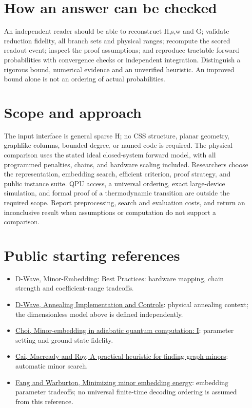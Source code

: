 \documentclass[11pt,letterpaper]{article}
\begin{document}
\section{How an answer can be checked}
An independent reader should be able to reconstruct H,s,w and G; validate reduction fidelity, all branch sets and physical ranges; recompute the scored readout event; inspect the proof assumptions; and reproduce tractable forward probabilities with convergence checks or independent integration. Distinguish a rigorous bound, numerical evidence and an unverified heuristic. An improved bound alone is not an ordering of actual probabilities.\par
\section{Scope and approach}
The input interface is general sparse H; no CSS structure, planar geometry, graphlike columns, bounded degree, or named code is required. The physical comparison uses the stated ideal closed-system forward model, with all programmed penalties, chains, and hardware scaling included. Researchers choose the representation, embedding search, efficient criterion, proof strategy, and public instance suite. QPU access, a universal ordering, exact large-device simulation, and formal proof of a thermodynamic transition are outside the required scope. Report preprocessing, search and evaluation costs, and return an inconclusive result when assumptions or computation do not support a comparison.\par
\section{Public starting references}
\begin{itemize}
\item \href{https://docs.dwavequantum.com/en/latest/quantum_research/embedding_guidance.html}{D-Wave, Minor-Embedding: Best Practices}: hardware mapping, chain strength and coefficient-range tradeoffs.
\item \href{https://docs.dwavequantum.com/en/latest/quantum_research/annealing.html}{D-Wave, Annealing Implementation and Controls}: physical annealing context; the dimensionless model above is defined independently.
\item \href{https://arxiv.org/abs/0804.4884}{Choi, Minor-embedding in adiabatic quantum computation: I}: parameter setting and ground-state fidelity.
\item \href{https://arxiv.org/abs/1406.2741}{Cai, Macready and Roy, A practical heuristic for finding graph minors}: automatic minor search.
\item \href{https://arxiv.org/abs/1905.03291}{Fang and Warburton, Minimizing minor embedding energy}: embedding parameter tradeoffs; no universal finite-time decoding ordering is assumed from this reference.
\end{itemize}
\end{document}
